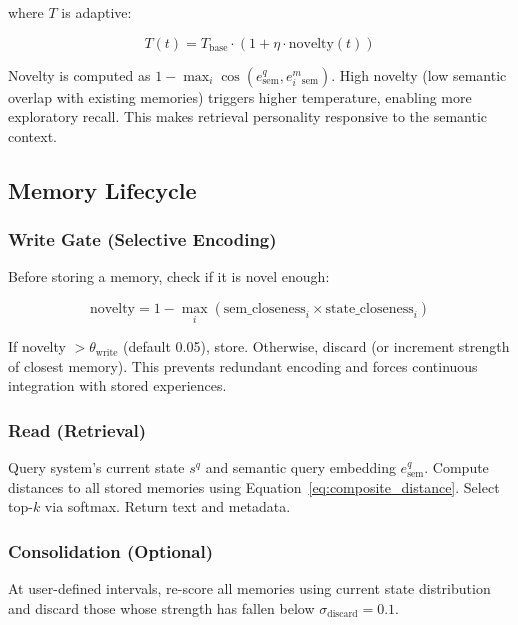 \documentclass[10pt,twocolumn,letterpaper]{article}
\begin{document}
where $T$ is adaptive:

\begin{equation}
T(t) = T_{\text{base}} \cdot (1 + \eta \cdot \text{novelty}(t))
\end{equation}

Novelty is computed as $1 - \max_i \cos(e^q_{\text{sem}}, e^m_i_{\text{sem}})$. High novelty (low semantic overlap with existing memories) triggers higher temperature, enabling more exploratory recall. This makes retrieval personality responsive to the semantic context.

\subsection{Memory Lifecycle}

\subsubsection{Write Gate (Selective Encoding)}

Before storing a memory, check if it is novel enough:

\begin{equation}
\text{novelty} = 1 - \max_i (\text{sem\_closeness}_i \times \text{state\_closeness}_i)
\end{equation}

If novelty $> \theta_{\text{write}}$ (default 0.05), store. Otherwise, discard (or increment strength of closest memory). This prevents redundant encoding and forces continuous integration with stored experiences.

\subsubsection{Read (Retrieval)}

Query system's current state $s^q$ and semantic query embedding $e^q_{\text{sem}}$. Compute distances to all stored memories using Equation~\ref{eq:composite_distance}. Select top-$k$ via softmax. Return text and metadata.

\subsubsection{Consolidation (Optional)}

At user-defined intervals, re-score all memories using current state distribution and discard those whose strength has fallen below $\sigma_{\text{discard}} = 0.1$.
\end{document}
